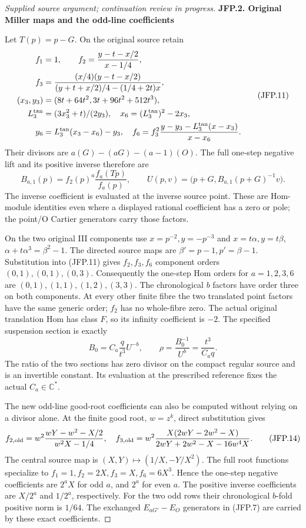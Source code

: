 \begin{proof}[Supplied source argument; continuation review in progress]
\par

\medskip\noindent\textbf{JFP.2. Original Miller maps and the odd-line coefficients}

\par\nobreak

Let \(T(p)=p-G\). On the original source retain
\[
\begin{split}
 f_1&=1,\qquad f_2=\frac{y-t-x/2}{x-1/4},\\
 f_3&=\frac{(x/4)(y-t-x/2)}{(y+t+x/2)/4-(1/4+2t)x},\\
 (x_3,y_3)&=(8t+64t^2,3t+96t^2+512t^3),\\
 L_3^{\rm tan}&=(3x_3^2+t)/(2y_3),\quad
 x_6=(L_3^{\rm tan})^2-2x_3,\\
 y_6&=L_3^{\rm tan}(x_3-x_6)-y_3,\quad
 f_6=f_3^2\frac{y-y_3-L_3^{\rm tan}(x-x_3)}{x-x_6}.
\end{split}
\tag{JFP.11}
\]
Their divisors are \(a(G)-(aG)-(a-1)(O)\). The full one-step
negative lift and its positive inverse therefore are
\[
 B_{a,1}(p)=f_2(p)^a\frac{f_a(Tp)}{f_a(p)},\qquad
 U(p,v)=\bigl(p+G,B_{a,1}(p+G)^{-1}v\bigr).
\tag{JFP.12}
\]
The inverse coefficient is evaluated at the inverse source point.
These are Hom-module identities even where a displayed rational
coefficient has a zero or pole; the point/O Cartier generators
carry those factors.

On the two original III components use
\(x=p^{-2},y=-p^{-3}\) and
\(x=t\alpha,y=t\beta\),
\(\alpha+t\alpha^3=\beta^2-1\). The directed source maps are
\(\beta'=p-1,p'=\beta-1\). Substitution into (JFP.11) gives
\(f_2,f_3,f_6\) component orders \((0,1),(0,1),(0,3)\).
Consequently the one-step Hom orders for \(a=1,2,3,6\) are
\((0,1),(1,1),(1,2),(3,3)\). The chronological \(b\) factors
have order three on both components. At every other finite fibre
the two translated point factors have the same generic order;
\(f_2\) has no whole-fibre zero. The actual original translation
Hom has class \(F\), so its infinity coefficient is \(-2\).
The specified suspension section is exactly
\[
 B_0=C_a\frac q{t^3}U^{-b},\qquad
 \rho=\frac{B_0^{-1}}{U^b}=\frac{t^3}{C_aq}.
\tag{JFP.13}
\]
The ratio of the two sections has zero divisor on the compact
regular source and is an invertible constant. Its evaluation at
the prescribed reference fixes the actual \(C_a\in\mathbb C^*\).

The new odd-line good-root coefficients can also be computed
without relying on a divisor alone. At the finite good root,
\(w=z^k\), direct substitution gives
\[
 f_{2,\rm old}=w^2\frac{wY-w^2-X/2}{w^2X-1/4},\quad
 f_{3,\rm old}=w^2\frac{X(2wY-2w^2-X)}
 {2wY+2w^2-X-16w^4X}.
\tag{JFP.14}
\]
The central source map is \((X,Y)\mapsto(1/X,-Y/X^2)\).
The full root functions specialize to \(f_1=1,f_2=2X,
f_3=X,f_6=6X^3\). Hence the one-step negative coefficients
are \(2^aX\) for odd \(a\), and \(2^a\) for even \(a\).
The positive inverse coefficients are \(X/2^a\) and \(1/2^a\),
respectively. For the two odd rows their chronological \(b\)-fold
positive norm is \(1/64\). The exchanged \(E_{aG'}-E_O\)
generators in (JFP.7) are carried by these exact coefficients.


\end{proof}
